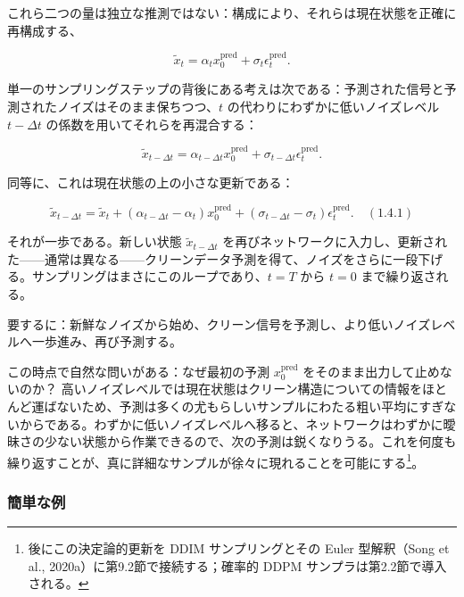 これら二つの量は独立な推測ではない：構成により、それらは現在状態を正確に再構成する、

\[
\tilde{x}_t = \alpha_t x_0^{\mathrm{pred}} + \sigma_t \epsilon_t^{\mathrm{pred}}.
\]


単一のサンプリングステップの背後にある考えは次である：予測された信号と予測されたノイズはそのまま保ちつつ、$t$ の代わりにわずかに低いノイズレベル $t-\Delta t$ の係数を用いてそれらを再混合する：

\[
\tilde{x}_{t-\Delta t} = \alpha_{t-\Delta t} x_0^{\mathrm{pred}} + \sigma_{t-\Delta t} \epsilon_t^{\mathrm{pred}}.
\]


同等に、これは現在状態の上の小さな更新である：

\[
\tilde{x}_{t-\Delta t}
= \tilde{x}_t
+ (\alpha_{t-\Delta t} - \alpha_t) x_0^{\mathrm{pred}}
+ (\sigma_{t-\Delta t} - \sigma_t) \epsilon_t^{\mathrm{pred}}. \quad (1.4.1)
\]


それが一歩である。新しい状態 $\tilde{x}_{t-\Delta t}$ を再びネットワークに入力し、更新された——通常は異なる——クリーンデータ予測を得て、ノイズをさらに一段下げる。サンプリングはまさにこのループであり、$t = T$ から $t = 0$ まで繰り返される。

\begin{propositionbox}[メッセージ]
要するに：新鮮なノイズから始め、クリーン信号を予測し、より低いノイズレベルへ一歩進み、再び予測する。
\end{propositionbox}




この時点で自然な問いがある：なぜ最初の予測 $x_0^{\mathrm{pred}}$ をそのまま出力して止めないのか？ 高いノイズレベルでは現在状態はクリーン構造についての情報をほとんど運ばないため、予測は多くの尤もらしいサンプルにわたる粗い平均にすぎないからである。わずかに低いノイズレベルへ移ると、ネットワークはわずかに曖昧さの少ない状態から作業できるので、次の予測は鋭くなりうる。これを何度も繰り返すことが、真に詳細なサンプルが徐々に現れることを可能にする\footnote{後にこの決定論的更新を DDIM サンプリングとその Euler 型解釈（Song et al., 2020a）に第9.2節で接続する；確率的 DDPM サンプラは第2.2節で導入される。}。


\subsubsection*{簡単な例}



